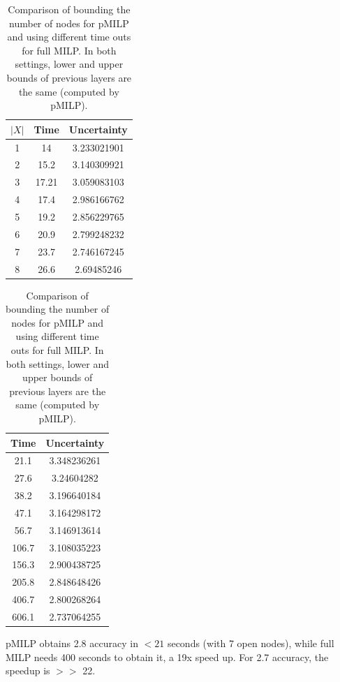 \begin{table}[h!]
	\centering
	\hspace*{4ex}
\begin{subtable}[b]{0.45\textwidth}
	\centering
		\begin{tabular}{|c|c|c|}
	\hline
		$|X|$ & Time & Uncertainty\\ 
	\hline1 &	14 & 3.233021901\\
\hline	2 & 15.2 & 3.140309921\\
\hline	3 & 17.21 & 3.059083103\\
\hline 4 &	17.4 & 2.986166762\\
\hline	5 &19.2 & 2.856229765\\
\hline	6 &20.9 & 2.799248232\\
\hline	7 &23.7 & 2.746167245\\
\hline	8 &26.6 & 2.69485246\\	
	\hline
	\end{tabular}
	\caption{pMILP}
\end{subtable}
\hfill
\begin{subtable}[b]{0.45\textwidth}
	\centering
		\begin{tabular}{|c|c|}
		\hline
		Time & Uncertainty\\ 
		\hline	21.1 & 3.348236261\\
		\hline	27.6 & 3.24604282\\
		\hline	38.2 & 3.196640184\\
		\hline	47.1 & 3.164298172\\
		\hline	56.7 & 3.146913614\\
		\hline	106.7 & 3.108035223\\
		\hline	156.3 & 2.900438725\\
		\hline	205.8 & 2.848648426\\	
		\hline	406.7 & 2.800268264 \\	
		\hline	606.1 & 2.737064255\\	
		\hline
	\end{tabular}
		\caption{full MILP}
\end{subtable}
	\caption{Comparison of bounding the number of nodes for pMILP and 
	using different time outs for full MILP. In both settings, lower and upper bounds of previous layers are the same (computed by pMILP).}
	\label{table12}
	\end{table}

	

	

pMILP obtains 2.8 accuracy in $<21$ seconds (with 7 open nodes), while full MILP needs 400 seconds to obtain it, a 19x speed up. For 2.7 accuracy, the speedup is $>>$ 22.




